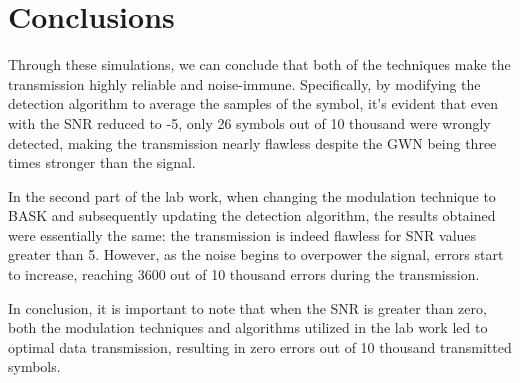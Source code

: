 % 
% 
\section*{Conclusions}
Through these simulations, we can conclude that both of the techniques make the transmission highly reliable and noise-immune. Specifically, by modifying the detection algorithm to average the samples of the symbol, it's evident that even with the SNR reduced to -5, only 26 symbols out of 10 thousand were wrongly detected, making the transmission nearly flawless despite the GWN being three times stronger than the signal.

In the second part of the lab work, when changing the modulation technique to BASK and subsequently updating the detection algorithm, the results obtained were essentially the same: the transmission is indeed flawless for SNR values greater than 5. However, as the noise begins to overpower the signal, errors start to increase, reaching 3600 out of 10 thousand errors during the transmission.

In conclusion, it is important to note that when the SNR is greater than zero, both the modulation techniques and algorithms utilized in the lab work led to optimal data transmission, resulting in zero errors out of 10 thousand transmitted symbols.





